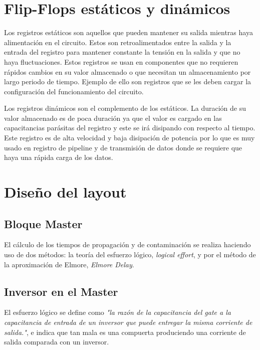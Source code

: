\documentclass[12pt,a4paper]{article} %
\begin{document}
\section{Flip-Flops estáticos y dinámicos}


Los registros estáticos son aquellos que pueden mantener su salida mientras haya alimentación en el circuito. Estos son retroalimentados entre la salida y la entrada del registro para mantener constante la tensión en la salida y que no haya fluctuaciones.  
Estos registros se usan en componentes que no requieren rápidos cambios en su valor almacenado o que necesitan un almacenamiento por largo periodo de tiempo. Ejemplo de ello son registros que se les deben cargar la configuración del funcionamiento del circuito.

Los registros dinámicos son el complemento de los estáticos. La duración de su valor almacenado es de poca duración ya que el valor es cargado en las capacitancias parásitas del registro y este se irá disipando con respecto al tiempo. Este registro es de alta velocidad y baja disipación de potencia por lo que es muy usado en registro de pipeline y de transmisión de datos donde se requiere que haya una rápida carga de los datos.


\section{Diseño del layout}

\subsection{Bloque Master}

El cálculo de los tiempos de propagación y de contaminación se realiza haciendo uso de dos métodos: la teoría del esfuerzo lógico, \textit{logical effort}, y por el método de la aproximación de Elmore, \textit{Elmore Delay}.\\

\subsection{Inversor en el Master}

El esfuerzo lógico se define como \textit{"la razón de la capacitancia del gate a la capacitancia de entrada de un inversor que puede entregar la misma corriente de salida."}, e indica que tan mala es una compuerta produciendo una corriente de salida comparada con un inversor.\\
\end{document}
